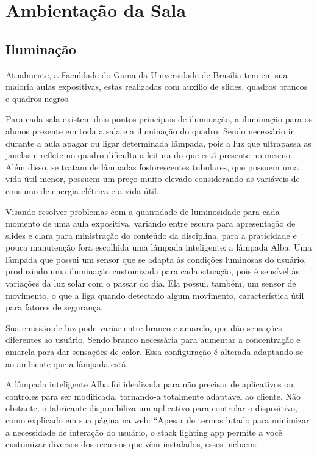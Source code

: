 \section{Ambientação da Sala}
\subsection{Iluminação}
Atualmente, a Faculdade do Gama da Universidade de Brasília tem em sua maioria aulas expositivas, estas realizadas com auxílio de slides, quadros brancos e quadros negros.

Para cada sala existem dois pontos principais de iluminação, a iluminação para os alunos presente em toda a sala e a iluminação do quadro. Sendo necessário ir durante a aula apagar ou ligar determinada lâmpada, pois a luz que ultrapassa as janelas e reflete no quadro dificulta a leitura do que está presente no mesmo. Além disso, se tratam de lâmpadas fosforescentes tubulares, que possuem uma vida útil menor, possuem um preço muito elevado considerando as variáveis de consumo de energia elétrica e a vida útil.

Visando resolver problemas com a quantidade de luminosidade para cada momento de uma aula expositiva, variando entre escura para apresentação de slides e clara para ministração do conteúdo da disciplina, para a praticidade e pouca manutenção fora escolhida uma lâmpada inteligente: a lâmpada Alba.
Uma lâmpada que possui um sensor que se adapta às condições luminosas do usuário, produzindo uma iluminação customizada para cada situação, pois é sensível às variações da luz solar com o passar do dia. Ela possui. também, um sensor de movimento, o que a liga quando detectado algum movimento, característica útil para fatores de segurança.

Sua emissão de luz pode variar entre branco e amarelo, que dão sensações diferentes ao usuário. Sendo branco necessária para aumentar a concentração e amarela para dar sensações de calor. Essa configuração é alterada adaptando-se ao ambiente que a lâmpada está.

A lâmpada inteligente Alba foi idealizada para não precisar de aplicativos ou controles para ser modificada, tornando-a totalmente adaptável ao cliente. Não obstante, o fabricante disponibiliza um aplicativo para controlar o dispositivo, como explicado em sua página na web: “Apesar de termos lutado para minimizar a necessidade de interação do usuário, o stack lighting app permite a você customizar diversos dos recursos que vêm instalados, esses incluem:

